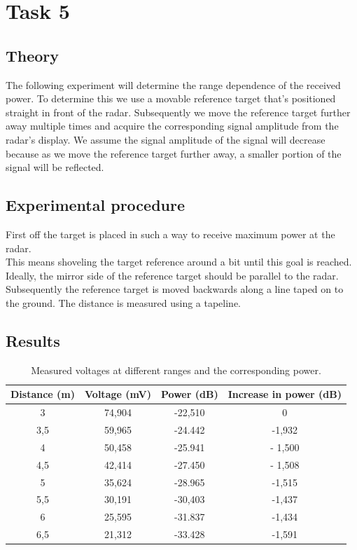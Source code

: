 \documentclass[final]{scrreprt} %
\begin{document}
\chapter{Task 5}
\section{Theory}
The following experiment will determine the range dependence of the received power. 
To determine this we use a movable reference target that's positioned straight in front of the radar. 
Subsequently we move the reference target further away multiple times and acquire the corresponding signal amplitude from the radar's display.
We assume the signal amplitude of the signal will decrease because as we move the reference target further away, a smaller portion of the signal will be reflected.

\section{Experimental procedure}
First off the target is placed in such a way to receive maximum power at the radar.\\
This means shoveling the target reference around a bit until this goal is reached.\\
Ideally, the mirror side of the reference target should be parallel to the radar.\\
Subsequently the reference target is moved backwards along a line taped on to the ground.
The distance is measured using a tapeline.

\section{Results}
\begin{table}[H]
\begin{center}
\begin{tabular}{|c | c | c | c|}
\hline
Distance (m) & Voltage (mV) & Power (dB) & Increase in power (dB)\\
\hline
3 & 74,904 & -22,510 & 0\\
\hline
3,5 & 59,965 & -24.442 & -1,932\\
\hline
4 & 50,458 &  -25.941 & - 1,500\\
\hline
4,5 & 42,414 & -27.450 & - 1,508\\
\hline
5 & 35,624 & -28.965 & -1,515\\
\hline
5,5 & 30,191 & -30,403 & -1,437\\
\hline
6 & 25,595 & -31.837 & -1,434\\
\hline
6,5 & 21,312 & -33.428 & -1,591\\
\hline
\end{tabular}
\caption{Measured voltages at different ranges and the corresponding power.}
\label{tab:receivedpower}
\end{center}
\end{table}
\end{document}
